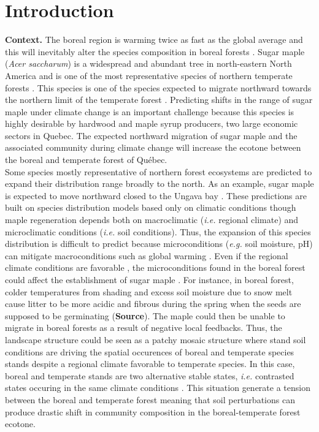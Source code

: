 


\newpage
\setcounter{page}{1}

\section{Introduction}

\textbf{Context.}  The boreal region is warming twice as fast as the global
average and  this will inevitably alter the species composition in boreal
forests \cite{Scheffer2012,Hughes2000}. Sugar maple (\textit{Acer saccharum})
is a widespread and abundant tree in north-eastern North America and is one of
the most representative species of northern temperate forests
\cite{Graignic2013,Messaoud2007,Kellman2004,Barras1998}. This species is one
of the species expected to migrate northward towards the northern limit of the
temperate forest \cite{McKENNEY2007,Goldblum2005}. Predicting shifts in the
range of sugar maple under climate change is an important challenge because
this species is highly desirable by hardwood and maple syrup producers, two
large economic sectors in Quebec. The expected northward migration of sugar
maple and the associated community during climate change will increase the
ecotone between the boreal and temperate forest of Québec.\\

Some species mostly representative of northern forest ecosystems are predicted
to expand their distribution range broadly to the north. As an example, sugar
maple is expected to move northward closed to the Ungava bay
\cite{McKENNEY2007}. These predictions are built on species distribution
models based only on climatic conditions though maple regeneration depends
both on macroclimatic (\textit{i.e.} regional climate) and microclimatic
conditions (\textit{i.e.} soil conditions). Thus, the expansion of this
species distribution is difficult to predict because microconditions
(\textit{e.g.} soil moisture, pH) can mitigate macroconditions such as global
warming \cite{DeFrenne2013}. Even if the regional climate conditions are
favorable \cite{Kellman2004}, the microconditions found in the boreal forest
could affect the establishment of sugar maple
\cite{Kellman2004,Moore2008,DeFrenne2013,Barras1998}. For instance, in boreal
forest, colder temperatures from shading and excess soil moisture due to snow
melt cause litter to be more acidic and fibrous during the spring  when the
seeds are supposed to be germinating (\textbf{Source}). The maple could then
be unable to migrate in boreal forests as a result of negative local
feedbacks. Thus, the landscape structure could be seen as a patchy mosaic
structure where stand soil conditions are driving the spatial occurences of
boreal and temperate species stands despite a regional climate favorable to
temperate species. In this case, boreal and temperate stands are two
alternative stable states, \textit{i.e.} contrasted states occuring in the
same climate conditions \cite{scheffer2009critical}. This situation generate a
tension between the boreal and temperate forest meaning that soil
perturbations can produce drastic shift in community composition in the
boreal-temperate forest ecotone.\\

